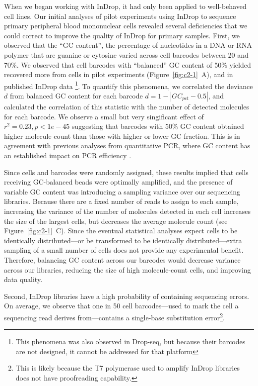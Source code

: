 When we began working with InDrop, it had only been applied to well-behaved cell lines. 
Our initial analyses of pilot experiments using InDrop to sequence primary peripheral blood mononuclear cells revealed several deficiencies that we could correct to improve the quality of InDrop for primary samples.
First, we observed that the ``GC content'', the percentage of nucleotides in a DNA or RNA polymer that are guanine or cytosine varied across cell barcodes between 20 and 70\%. 
We observed that cell barcodes with ``balanced'' GC content of 50\% yielded recovered more from cells in pilot experiments (Figure~\ref{fig:c2-1}~A), and in published InDrop data \citep{Klein2015}\footnote{This phenomena was also observed in Drop-seq, but because their barcodes are not designed, it cannot be addressed for that platform}.
To quantify this phenomena, we correlated the deviance $d$ from balanced GC content for each barcode $d = 1 - |GC_{pct} - 0.5|$, and calculated the correlation of this statistic with the number of detected molecules for each barcode. 
We observe a small but very singificant effect of $r^{2} = 0.23, p < 1e-45$ suggesting that barcodes with 50\% GC content obtained higher molecule count than those with higher or lower GC fraction.
This is in agreement with previous analyses from quantitative PCR, where GC content has an established impact on PCR efficiency \citep{Mamedov2008}. 

Since cells and barcodes were randomly assigned, these results implied that cells receiving GC-balanced beads were optimally amplified, and the presence of variable GC content was introducing a sampling variance over our sequencing libraries.
Because there are a fixed number of reads to assign to each sample, increasing the variance of the number of molecules detected in each cell increases the size of the largest cells, but decreases the average molecule count (see Figure~\ref{fig:c2-1}~C).
Since the eventual statistical analyses expect cells to be identically distributed---or be transformed to be identically distributed---extra sampling of a small number of cells does not provide any experimental benefit. 
Therefore, balancing GC content across our barcodes would decrease variance across our libraries, reducing the size of high molecule-count cells, and improving data quality. 

Second, InDrop libraries have a high probability of containing sequencing errors. 
On average, we observe that one in 50 cell barcodes---used to mark the cell a sequencing read derives from---contains a single-base substitution error\footnote{This is likely because the T7 polymerase used to amplify InDrop libraries does not have proofreading capability.}. 

